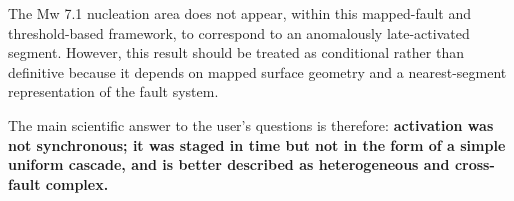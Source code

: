 \documentclass[11pt]{article}
\begin{document}
The Mw 7.1 nucleation area does not appear, within this mapped-fault and threshold-based framework, to correspond to an anomalously late-activated segment. However, this result should be treated as conditional rather than definitive because it depends on mapped surface geometry and a nearest-segment representation of the fault system.

The main scientific answer to the user’s questions is therefore: \textbf{activation was not synchronous; it was staged in time but not in the form of a simple uniform cascade, and is better described as heterogeneous and cross-fault complex.}
\end{document}
